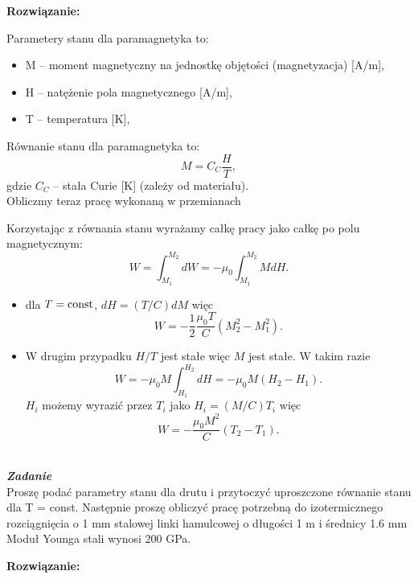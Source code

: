 \documentclass[11pt,a4paper]{article}
\newcounter{zadanie}\newcommand{\zadanie}[1][]{\addtocounter{zadanie}{1} ~\\  {\bf \emph{Zadanie \arabic{zadanie} #1 }} \\}
\begin{document}
\vskip 10pt
\textbf{Rozwiązanie:}
\vskip 10pt

Parametery stanu dla paramagnetyka to:
\begin{itemize}
	\item M -- moment magnetyczny na jednostkę objętości (magnetyzacja) [A/m],
	\item H -- natężenie pola magnetycznego [A/m],
	\item T -- temperatura [K],
\end{itemize} 

Równanie stanu dla paramagnetyka to:
\begin{equation}
	M = C_{C} \frac{H}{T},
\end{equation}
gdzie $C_C$ -- stała Curie [K] (zależy od materiału). \\
Obliczmy teraz pracę wykonaną w przemianach


Korzystając z równania stanu wyrażamy całkę pracy jako całkę po 
polu magnetycznym:
\begin{equation}
	W = \int_{M_1}^{M_2} dW = - \mu_0 \int_{M_1}^{M_2} M dH.
\end{equation}	

\begin{itemize}
\item dla $T={\rm const}$, $dH = (T/C) dM$ więc 
\begin{equation}
	W = - \frac{1}{2} \frac{\mu_0 T}{C} \left(M_2^2 - M_1^2 \right).
\end{equation} 
\item W drugim przypadku $H/T$ jest stałe więc $M$ jest stałe. W takim razie 
\begin{equation}
	W = - \mu_0 M \int_{H_1}^{H_2} dH = - \mu_0 M (H_2 - H_1).
\end{equation}
$H_i$ możemy wyrazić przez $T_i$ jako $H_i = (M/C) T_i$ więc 
\begin{equation}
	W = - \frac{\mu_0 M^2}{C} (T_2 - T_1).
\end{equation}

\end{itemize}
\newpage
\zadanie

Proszę podać parametry stanu dla drutu i przytoczyć 
uproszczone równanie stanu dla T = const.
Następnie proszę obliczyć pracę potrzebną do izotermicznego rozciągnięcia 
o 1 mm stalowej linki hamulcowej o długości 1 m i średnicy 1.6 mm
Moduł Younga stali wynosi 200 GPa.

\vskip 10pt
\textbf{Rozwiązanie:}
\vskip 10pt
\end{document}
